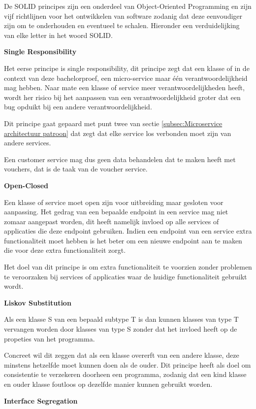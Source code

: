  De SOLID principes zijn een onderdeel van Object-Oriented Programming en zijn vijf richtlijnen voor het ontwikkelen van software zodanig dat deze eenvoudiger zijn om te onderhouden en eventueel te schalen. Hieronder een verduidelijking van elke letter in het woord SOLID. \autocite{Thelma}
 
 \textbf{Single Responsibility}
 
 Het eerse principe is single responsibility, dit principe zegt dat een klasse of in de context van deze bachelorproef, een micro-service maar één verantwoordelijkheid mag hebben. Naar mate een klasse of service meer verantwoordelijkheden heeft, wordt her risico bij het aanpassen van een verantwoordelijkheid groter dat een bug opduikt bij een andere verantwoordelijkheid. 
 
 Dit principe gaat gepaard met punt twee van sectie \ref{subsec:Microservice architectuur patroon} dat zegt dat elke service los verbonden moet zijn van andere services.
 
 Een customer service mag dus geen data behandelen dat te maken heeft met vouchers, dat is de taak van de voucher service.
 
 \textbf{Open-Closed}
 
 Een klasse of service moet open zijn voor uitbreiding maar gesloten voor aanpassing. Het gedrag van een bepaalde endpoint in een service mag niet zomaar aangepast worden, dit heeft namelijk invloed op alle services of applicaties die deze endpoint gebruiken. Indien een endpoint van een service extra functionaliteit moet hebben is het beter om een nieuwe endpoint aan te maken die voor deze extra functionaliteit zorgt.
 
 Het doel van dit principe is om extra functionaliteit te voorzien zonder problemen te veroorzaken bij services of applicaties waar de huidige functionaliteit gebruikt wordt.
 
 \textbf{Liskov Substitution}
 
 Als een klasse S van een bepaald subtype T is dan kunnen klasses van type T vervangen worden door klasses van type S zonder dat het invloed heeft op de propeties van het programma.
 
 Concreet wil dit zeggen dat als een klasse overerft van een andere klasse, deze minstens hetzelfde moet kunnen doen als de ouder. Dit principe heeft als doel om consistentie te verzekeren doorheen een programma, zodanig dat een kind klasse en ouder klasse foutloos op dezelfde manier kunnen gebruikt worden.
 
 \textbf{Interface Segregation}
 
